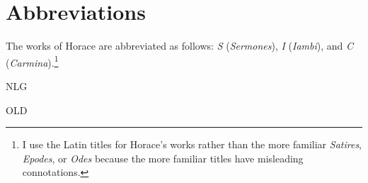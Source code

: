 \chapter{Abbreviations}

The works of Horace are abbreviated as follows: \textit{S} (\textit{Sermones}), \textit{I} (\textit{Iambi}), and \textit{C} (\textit{Carmina}).\footnote{I use the Latin titles for Horace's works rather than the more familiar \textit{Satires}, \textit{Epodes}, or \textit{Odes} because the more familiar titles have misleading connotations.}

\begin{abbreviations}
    \item[NLG] 
    \item[OLD] 
\end{abbreviations}
